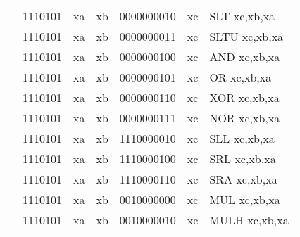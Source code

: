 \begin{table}[p]
\begin{small}
\begin{center}
\begin{tabular}{rcccccccccl}
&
\multicolumn{2}{|c|}{1110101} &
\multicolumn{1}{c|}{xa} &
\multicolumn{1}{c|}{xb} &
\multicolumn{4}{c|}{0000000010} &
\multicolumn{1}{c|}{xc} & SLT xc,xb,xa \\
\cline{2-10}
  

&
\multicolumn{2}{|c|}{1110101} &
\multicolumn{1}{c|}{xa} &
\multicolumn{1}{c|}{xb} &
\multicolumn{4}{c|}{0000000011} &
\multicolumn{1}{c|}{xc} & SLTU xc,xb,xa \\
\cline{2-10}
  

&
\multicolumn{2}{|c|}{1110101} &
\multicolumn{1}{c|}{xa} &
\multicolumn{1}{c|}{xb} &
\multicolumn{4}{c|}{0000000100} &
\multicolumn{1}{c|}{xc} & AND xc,xb,xa \\
\cline{2-10}
  

&
\multicolumn{2}{|c|}{1110101} &
\multicolumn{1}{c|}{xa} &
\multicolumn{1}{c|}{xb} &
\multicolumn{4}{c|}{0000000101} &
\multicolumn{1}{c|}{xc} & OR xc,xb,xa \\
\cline{2-10}
  

&
\multicolumn{2}{|c|}{1110101} &
\multicolumn{1}{c|}{xa} &
\multicolumn{1}{c|}{xb} &
\multicolumn{4}{c|}{0000000110} &
\multicolumn{1}{c|}{xc} & XOR xc,xb,xa \\
\cline{2-10}
  

&
\multicolumn{2}{|c|}{1110101} &
\multicolumn{1}{c|}{xa} &
\multicolumn{1}{c|}{xb} &
\multicolumn{4}{c|}{0000000111} &
\multicolumn{1}{c|}{xc} & NOR xc,xb,xa \\
\cline{2-10}
  

&
\multicolumn{2}{|c|}{1110101} &
\multicolumn{1}{c|}{xa} &
\multicolumn{1}{c|}{xb} &
\multicolumn{4}{c|}{1110000010} &
\multicolumn{1}{c|}{xc} & SLL xc,xb,xa \\
\cline{2-10}
  

&
\multicolumn{2}{|c|}{1110101} &
\multicolumn{1}{c|}{xa} &
\multicolumn{1}{c|}{xb} &
\multicolumn{4}{c|}{1110000100} &
\multicolumn{1}{c|}{xc} & SRL xc,xb,xa \\
\cline{2-10}
  

&
\multicolumn{2}{|c|}{1110101} &
\multicolumn{1}{c|}{xa} &
\multicolumn{1}{c|}{xb} &
\multicolumn{4}{c|}{1110000110} &
\multicolumn{1}{c|}{xc} & SRA xc,xb,xa \\
\cline{2-10}
  

&
\multicolumn{2}{|c|}{1110101} &
\multicolumn{1}{c|}{xa} &
\multicolumn{1}{c|}{xb} &
\multicolumn{4}{c|}{0010000000} &
\multicolumn{1}{c|}{xc} & MUL xc,xb,xa \\
\cline{2-10}
  

&
\multicolumn{2}{|c|}{1110101} &
\multicolumn{1}{c|}{xa} &
\multicolumn{1}{c|}{xb} &
\multicolumn{4}{c|}{0010000010} &
\multicolumn{1}{c|}{xc} & MULH xc,xb,xa \\
\cline{2-10}
  


\end{tabular}
\end{center}
\end{small}
\end{table}
